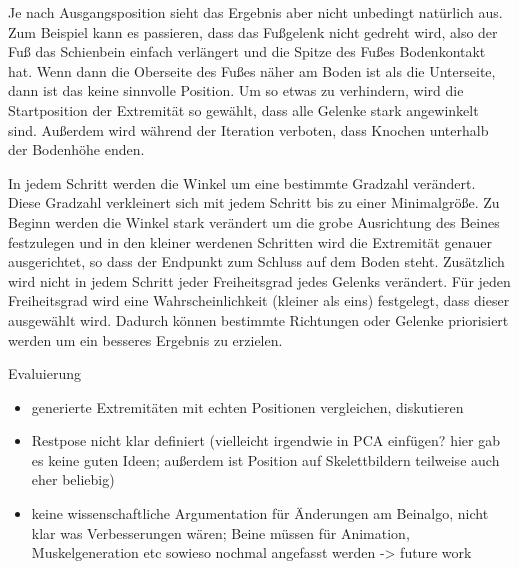 Je nach Ausgangsposition sieht das Ergebnis aber nicht unbedingt natürlich aus. Zum Beispiel kann es passieren, dass das Fußgelenk nicht gedreht wird, also der Fuß das Schienbein einfach verlängert und die Spitze des Fußes Bodenkontakt hat. Wenn dann die Oberseite des Fußes näher am Boden ist als die Unterseite, dann ist das keine sinnvolle Position.
Um so etwas zu verhindern, wird die Startposition der Extremität so gewählt, dass alle Gelenke stark angewinkelt sind. 
Außerdem wird während der Iteration verboten, dass Knochen unterhalb der Bodenhöhe enden.

In jedem Schritt werden die Winkel um eine bestimmte Gradzahl verändert. Diese Gradzahl verkleinert sich mit jedem Schritt bis zu einer Minimalgröße. Zu Beginn werden die Winkel stark verändert um die grobe Ausrichtung des Beines festzulegen und in den kleiner werdenen Schritten wird die Extremität genauer ausgerichtet, so dass der Endpunkt zum Schluss auf dem Boden steht.
Zusätzlich wird nicht in jedem Schritt jeder Freiheitsgrad jedes Gelenks verändert. Für jeden Freiheitsgrad wird eine Wahrscheinlichkeit (kleiner als eins) festgelegt, dass dieser ausgewählt wird. Dadurch können bestimmte Richtungen oder Gelenke priorisiert werden um ein besseres Ergebnis zu erzielen. 

Evaluierung 
\begin{itemize}
 \item generierte Extremitäten mit echten Positionen vergleichen, diskutieren
 \item Restpose nicht klar definiert (vielleicht irgendwie in PCA einfügen? hier gab es keine guten Ideen; außerdem ist Position auf Skelettbildern teilweise auch eher beliebig)
 \item keine wissenschaftliche Argumentation für Änderungen am Beinalgo, nicht klar was Verbesserungen wären; Beine müssen für Animation, Muskelgeneration etc sowieso nochmal angefasst werden -> future work
\end{itemize}


